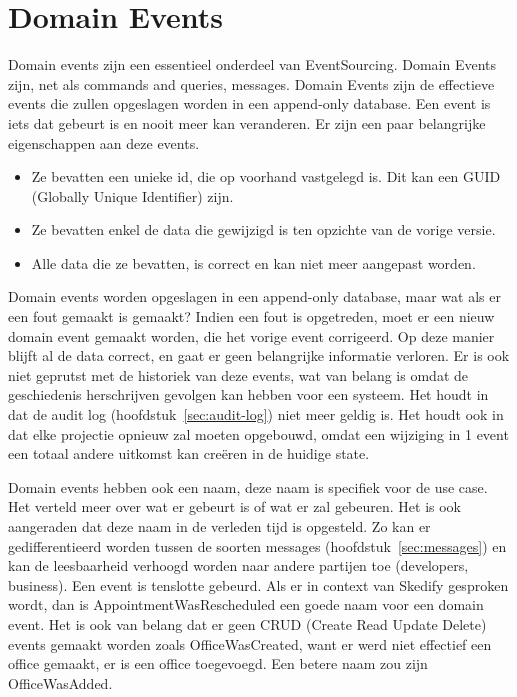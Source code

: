 
\section{Domain Events}
\label{sec:domain-events}

Domain events zijn een essentieel onderdeel van EventSourcing. Domain Events zijn, net als commands and queries, messages. Domain Events zijn de effectieve events die zullen opgeslagen worden in een append-only database. Een event is iets dat gebeurt is en nooit meer kan veranderen. Er zijn een paar belangrijke eigenschappen aan deze events.

\begin{itemize}
  \item{Ze bevatten een unieke id, die op voorhand vastgelegd is. Dit kan een GUID (Globally Unique Identifier) zijn.}
  \item{Ze bevatten enkel de data die gewijzigd is ten opzichte van de vorige versie.}
  \item{Alle data die ze bevatten, is correct en kan niet meer aangepast worden.}
\end{itemize}

Domain events worden opgeslagen in een append-only database, maar wat als er een fout gemaakt is gemaakt?
Indien een fout is opgetreden, moet er een nieuw domain event gemaakt worden, die het vorige event corrigeerd. Op deze manier blijft al de data correct, en gaat er geen belangrijke informatie verloren. Er is ook niet geprutst met de historiek van deze events, wat van belang is omdat de geschiedenis herschrijven gevolgen kan hebben voor een systeem. Het houdt in dat de audit log (hoofdstuk~\ref{sec:audit-log}) niet meer geldig is. Het houdt ook in dat elke projectie opnieuw zal moeten opgebouwd, omdat een wijziging in 1 event een totaal andere uitkomst kan creëren in de huidige state.

Domain events hebben ook een naam, deze naam is specifiek voor de use case. Het verteld meer over wat er gebeurt is of wat er zal gebeuren. Het is ook aangeraden dat deze naam in de verleden tijd is opgesteld. Zo kan er gedifferentieerd worden tussen de soorten messages (hoofdstuk~\ref{sec:messages}) en kan de leesbaarheid verhoogd worden naar andere partijen toe (developers, business). Een event is tenslotte gebeurd. Als er in context van Skedify gesproken wordt, dan is AppointmentWasRescheduled een goede naam voor een domain event. Het is ook van belang dat er geen CRUD (Create Read Update Delete) events gemaakt worden zoals OfficeWasCreated, want er werd niet effectief een office gemaakt, er is een office toegevoegd. Een betere naam zou zijn OfficeWasAdded.
